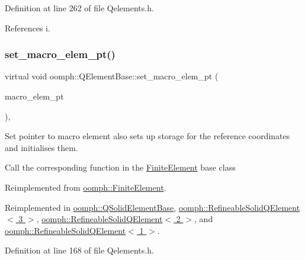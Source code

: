Definition at line 262 of file Qelements.\+h.



References i.

\mbox{\label{classoomph_1_1QElementBase_a072ce3dcdffdc446f439ec86ea01ae7e}} 
\subsubsection{\texorpdfstring{set\+\_\+macro\+\_\+elem\+\_\+pt()}{set\_macro\_elem\_pt()}}
{\footnotesize\ttfamily virtual void oomph\+::\+Q\+Element\+Base\+::set\+\_\+macro\+\_\+elem\+\_\+pt (\begin{DoxyParamCaption}\item[{\hyperlink{classoomph_1_1MacroElement}{Macro\+Element} $\ast$}]{macro\+\_\+elem\+\_\+pt }\end{DoxyParamCaption})\hspace{0.3cm}{\ttfamily [inline]}, {\ttfamily [virtual]}}



Set pointer to macro element also sets up storage for the reference coordinates and initialises them. 

Call the corresponding function in the \hyperlink{classoomph_1_1FiniteElement}{Finite\+Element} base class 

Reimplemented from \hyperlink{classoomph_1_1FiniteElement_a170b030b8365ebbab5287f0a420cc8c8}{oomph\+::\+Finite\+Element}.



Reimplemented in \hyperlink{classoomph_1_1QSolidElementBase_a0ceca47c039bbb38b0feb3baa330a27f}{oomph\+::\+Q\+Solid\+Element\+Base}, \hyperlink{classoomph_1_1RefineableSolidQElement_3_013_01_4_a2b1aa7874048e0f38370ae7bf761d315}{oomph\+::\+Refineable\+Solid\+Q\+Element$<$ 3 $>$}, \hyperlink{classoomph_1_1RefineableSolidQElement_3_012_01_4_aac8a230631c509dd854d71a5f68b6483}{oomph\+::\+Refineable\+Solid\+Q\+Element$<$ 2 $>$}, and \hyperlink{classoomph_1_1RefineableSolidQElement_3_011_01_4_ae0cd264bee16dd1d05d35f79e33dd408}{oomph\+::\+Refineable\+Solid\+Q\+Element$<$ 1 $>$}.



Definition at line 168 of file Qelements.\+h.



